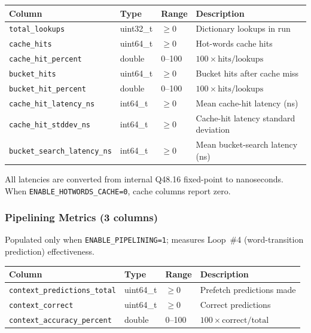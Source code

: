 \begin{center}
\begin{tabular}{llll}
\toprule
Column & Type & Range & Description \\
\midrule
\texttt{total\_lookups}           & uint32\_t & $\geq 0$ & Dictionary lookups in run \\
\texttt{cache\_hits}              & uint64\_t & $\geq 0$ & Hot-words cache hits \\
\texttt{cache\_hit\_percent}      & double    & 0--100   & $100 \times \text{hits} / \text{lookups}$ \\
\texttt{bucket\_hits}             & uint64\_t & $\geq 0$ & Bucket hits after cache miss \\
\texttt{bucket\_hit\_percent}     & double    & 0--100   & $100 \times \text{hits} / \text{lookups}$ \\
\texttt{cache\_hit\_latency\_ns}  & int64\_t  & $\geq 0$ & Mean cache-hit latency (ns) \\
\texttt{cache\_hit\_stddev\_ns}   & int64\_t  & $\geq 0$ & Cache-hit latency standard deviation \\
\texttt{bucket\_search\_latency\_ns} & int64\_t & $\geq 0$ & Mean bucket-search latency (ns) \\
\bottomrule
\end{tabular}
\end{center}

All latencies are converted from internal Q48.16 fixed-point to nanoseconds.
When \texttt{ENABLE\_HOTWORDS\_CACHE=0}, cache columns report zero.

\subsubsection{Pipelining Metrics (3 columns)}

Populated only when \texttt{ENABLE\_PIPELINING=1}; measures Loop~\#4
(word-transition prediction) effectiveness.

\begin{center}
\begin{tabular}{llll}
\toprule
Column & Type & Range & Description \\
\midrule
\texttt{context\_predictions\_total} & uint64\_t & $\geq 0$ & Prefetch predictions made \\
\texttt{context\_correct}            & uint64\_t & $\geq 0$ & Correct predictions \\
\texttt{context\_accuracy\_percent}  & double    & 0--100   & $100 \times \text{correct} / \text{total}$ \\
\bottomrule
\end{tabular}
\end{center}

